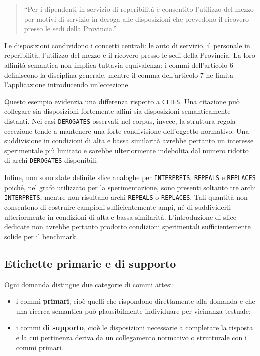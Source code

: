 \begin{quote}
``Per i dipendenti in servizio di reperibilità è consentito l'utilizzo del mezzo per motivi di servizio in deroga alle disposizioni che prevedono il ricovero presso le sedi della Provincia.''
\end{quote}

Le disposizioni condividono i concetti centrali: le auto di servizio, il personale in reperibilità, l'utilizzo del mezzo e il ricovero presso le sedi della Provincia. La loro affinità semantica non implica tuttavia equivalenza: i commi dell'articolo 6 definiscono la disciplina generale, mentre il comma dell'articolo 7 ne limita l'applicazione introducendo un'eccezione.

Questo esempio evidenzia una differenza rispetto a \texttt{CITES}. Una citazione può collegare sia disposizioni fortemente affini sia disposizioni semanticamente distanti. Nei casi \texttt{DEROGATES} osservati nel corpus, invece, la struttura regola--eccezione tende a mantenere una forte condivisione dell'oggetto normativo. Una suddivisione in condizioni di alta e bassa similarità avrebbe pertanto un interesse sperimentale più limitato e sarebbe ulteriormente indebolita dal numero ridotto di archi \texttt{DEROGATES} disponibili.

Infine, non sono state definite slice analoghe per \texttt{INTERPRETS}, \texttt{REPEALS} e \texttt{REPLACES} poiché, nel grafo utilizzato per la sperimentazione, sono presenti soltanto tre archi \texttt{INTERPRETS}, mentre non risultano archi \texttt{REPEALS} o \texttt{REPLACES}. Tali quantità non consentono di costruire campioni sufficientemente ampi, né di suddividerli ulteriormente in condizioni di alta e bassa similarità. L'introduzione di slice dedicate non avrebbe pertanto prodotto condizioni sperimentali sufficientemente solide per il benchmark.

\subsection{Etichette primarie e di supporto}

Ogni domanda distingue due categorie di commi attesi:

\begin{itemize}
    \item i commi \textbf{primari}, cioè quelli che rispondono direttamente alla domanda e che una ricerca semantica può plausibilmente individuare per vicinanza testuale;
    \item i commi \textbf{di supporto}, cioè le disposizioni necessarie a completare la risposta e la cui pertinenza deriva da un collegamento normativo o strutturale con i commi primari.
\end{itemize}

